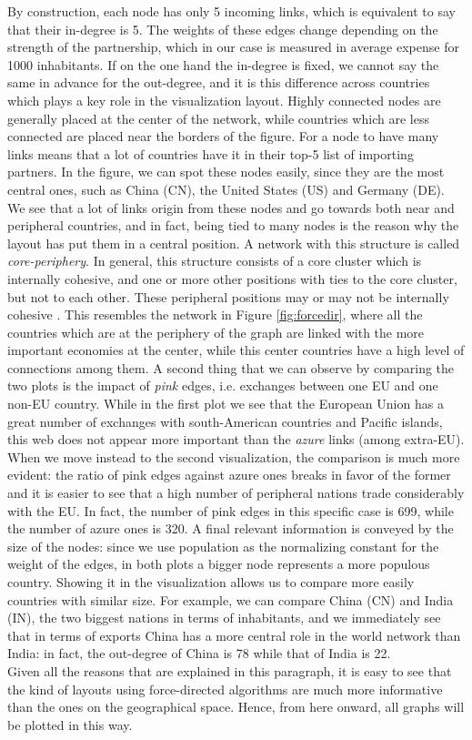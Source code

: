 By construction, each node has only 5 incoming links, which is equivalent to say that their in-degree is 5. The weights of these edges change depending on the strength of the partnership, which in our case is measured in average expense for 1000 inhabitants. If on the one hand the in-degree is fixed, we cannot say the same in advance for the out-degree, and it is this difference across countries which plays a key role in the visualization layout. Highly connected nodes are generally placed at the center of the network, while countries which are less connected are placed near the borders of the figure. For a node to have many links means that a lot of countries have it in their top-5 list of importing partners. In the figure, we can spot these nodes easily, since they are the most central ones, such as China (CN), the United States (US) and Germany (DE). We see that a lot of links origin from these nodes and go towards both near and peripheral countries, and in fact, being tied to many nodes is the reason why the layout has put them in a central position. A network with this structure is called \textit{core-periphery}. In general, this structure consists of a core cluster which is internally cohesive, and one or more other positions with ties to the core cluster, but not to each other. These peripheral positions may or may not be internally cohesive \cite{wasserman1994social}. This resembles the network in Figure \ref{fig:forcedir}, where all the countries which are at the periphery of the graph are linked with the more important economies at the center, while this center countries have a high level of connections among them.
A second thing that we can observe by comparing the two plots is the impact of \textit{pink} edges, i.e. exchanges between one EU and one non-EU country. While in the first plot we see that the European Union has a great number of exchanges with south-American countries and Pacific islands, this web does not appear more important than the \textit{azure} links (among extra-EU). When we move instead to the second visualization, the comparison is much more evident: the ratio of pink edges against azure ones breaks in favor of the former and it is easier to see that a high number of peripheral nations trade considerably with the EU. In fact, the number of pink edges in this specific case is 699, while the number of azure ones is 320. 
A final relevant information is conveyed by the size of the nodes: since we use population as the normalizing constant for the weight of the edges, in both plots a bigger node represents a more populous country. Showing it in the visualization allows us to compare more easily countries with similar size. For example, we can compare China (CN) and India (IN), the two biggest nations in terms of inhabitants, and we immediately see that in terms of exports China has a more central role in the world network than India: in fact, the out-degree of China is 78 while that of India is 22.\\
Given all the reasons that are explained in this paragraph, it is easy to see that the kind of layouts using force-directed algorithms are much more informative than the ones on the geographical space. Hence, from here onward, all graphs will be plotted in this way.



